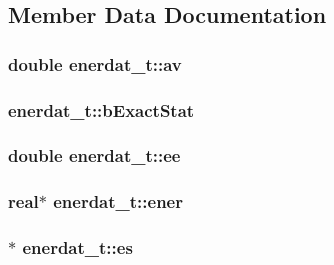 \subsection{\-Member \-Data \-Documentation}
\hypertarget{structenerdat__t_afee7c9789801163ff215554e658e6213}{
\subsubsection[{av}]{\setlength{\rightskip}{0pt plus 5cm}double {\bf enerdat\-\_\-t\-::av}}}\label{structenerdat__t_afee7c9789801163ff215554e658e6213}
\hypertarget{structenerdat__t_ab18be0a43a4b8352b861cee2ee7a6b02}{
\subsubsection[{b\-Exact\-Stat}]{ {\bf enerdat\-\_\-t\-::b\-Exact\-Stat}}}\label{structenerdat__t_ab18be0a43a4b8352b861cee2ee7a6b02}
\hypertarget{structenerdat__t_ad90a348426ab44dbf26f6b668f114e66}{
\subsubsection[{ee}]{\setlength{\rightskip}{0pt plus 5cm}double {\bf enerdat\-\_\-t\-::ee}}}\label{structenerdat__t_ad90a348426ab44dbf26f6b668f114e66}
\hypertarget{structenerdat__t_a834650bee926b1bec215d86a6acfb5ff}{
\subsubsection[{ener}]{\setlength{\rightskip}{0pt plus 5cm}real$\ast$ {\bf enerdat\-\_\-t\-::ener}}}\label{structenerdat__t_a834650bee926b1bec215d86a6acfb5ff}
\hypertarget{structenerdat__t_a8c0cc2277ca0f81699172692d25296a7}{
\subsubsection[{es}]{$\ast$ {\bf enerdat\-\_\-t\-::es}}}\label{structenerdat__t_a8c0cc2277ca0f81699172692d25296a7}
